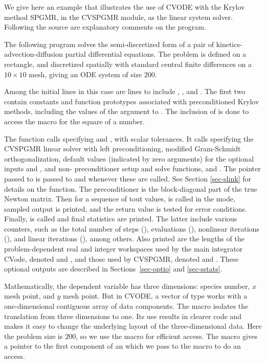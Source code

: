 We give here an example that illustrates the use of CVODE with the
Krylov method SPGMR, in the CVSPGMR module, as the linear system
solver.  Following the source are explanatory comments on the program.

The following program solves the semi-discretized form of a pair of
kinetics-advection-diffusion partial differential equations.  The
problem is defined on a rectangle, and discretized spatially with
standard central finite differences on a $10 \times 10$ mesh, giving
an ODE system of size $200$.

Among the initial  lines in this case are lines to
include , , and .
The first two contain constants and function prototypes associated
with preconditioned Krylov methods, including the values of the
 argument to .  The inclusion
of  is done to access the  macro for the
square of a  number.

The  function calls  specifying  and
, with scalar tolerances.  It calls  specifying
the CVSPGMR linear solver with left preconditioning, modified Gram-Schmidt
orthogonalization, default values
(indicated by zero arguments) for the optional inputs  and ,
and non- preconditioner setup and solve functions,  and
. The  pointer passed to  is passed to
 and  whenever these are called. See
Section \ref{sec-slink} for details on the  function.  
The preconditioner is the block-diagonal part of the true Newton matrix. 
Then for a sequence of tout values,  is called in the
 mode, sampled output is printed, and the return value is
tested for error conditions.  Finally,  is called and
final statistics are printed.  The latter include various counters,
such as the total number of steps (),  evaluations
(), nonlinear iterations (), and linear iterations
(), among others.  Also printed are the lengths of the
problem-dependent real and integer workspaces used by the main
integrator CVode, denoted  and , and those
used by CVSPGMR, denoted  and .
These optional outputs are described in Sections~\ref{sec-optio}
and \ref{sec-sstats}.

Mathematically, the dependent variable has three dimensions: species
number, $x$ mesh point, and $y$ mesh point.  But in CVODE, a vector of
type  works with a one-dimensional contiguous array of
data components. The macro  isolates the translation from
three dimensions to one. Its use results in clearer code and makes it
easy to change the underlying layout of the three-dimensional
data. Here the problem size is $200$, so we use the 
macro for efficient  access.  The  macro
gives a pointer to the first component of an  which we
pass to the  macro to do an  access.

